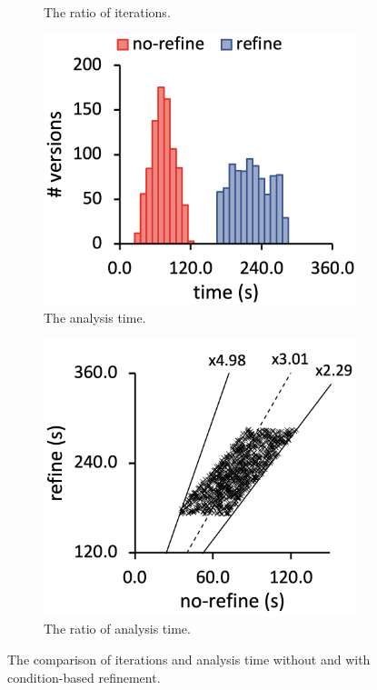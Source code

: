 \begin{figure}
\begin{subfigure}[b]{0.24\textwidth}
    \caption{The ratio of iterations.}
  \end{subfigure}
  \begin{subfigure}[b]{0.24\textwidth}
    \includegraphics[width=\textwidth]{img/compare-time}
    \caption{The analysis time.}
  \end{subfigure}
  \begin{subfigure}[b]{0.24\textwidth}
    \includegraphics[width=\textwidth]{img/ratio-time}
    \caption{The ratio of analysis time.}
  \end{subfigure}
  \caption{The comparison of iterations and analysis time without and with
  condition-based refinement.}
  \label{fig:refine}
\end{figure}


